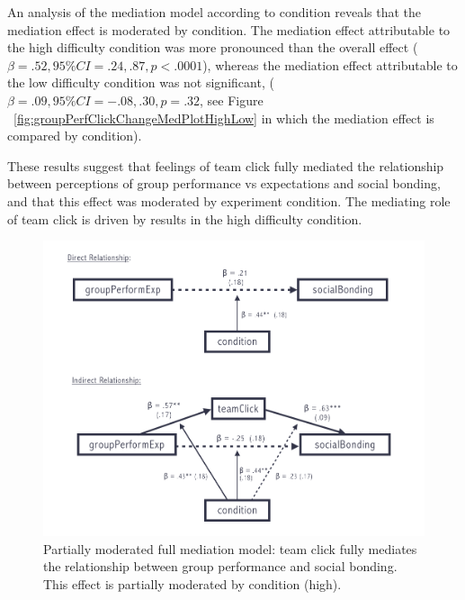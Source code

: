 An analysis of the mediation model according to condition reveals that the mediation effect is moderated by condition.  The mediation effect attributable to the high difficulty condition was more pronounced than the overall effect ($\beta = .52, 95\% CI = .24 , .87, p < .0001$), whereas the mediation effect attributable to the low difficulty condition was not significant, ($\beta = .09, 95\% CI = -.08 , .30, p = .32$, see Figure ~\ref{fig:groupPerfClickChangeMedPlotHighLow} in which the mediation effect is compared by condition).

These results suggest that feelings of team click fully mediated the relationship between perceptions of group performance vs expectations and social bonding, and that this effect was moderated by experiment condition.  The mediating role of team click is driven by results in the high difficulty condition.


\begin{figure}
  \centering
  \includegraphics[width=0.9\linewidth,keepaspectratio] {images/modMedPost}
  \caption{Partially moderated full mediation model: team click fully mediates the relationship between group performance and social bonding.  This effect is partially moderated by condition (high).}
  \label{fig:postExperimentModMedFigure}
\end{figure}

